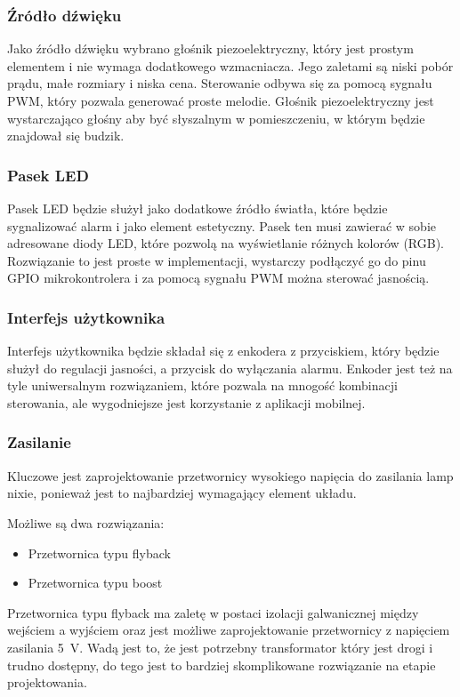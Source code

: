 \documentclass[../main.tex]{subfiles}
\begin{document}
\subsubsection{Źródło dźwięku}
Jako źródło dźwięku wybrano głośnik piezoelektryczny, który jest prostym elementem i nie wymaga dodatkowego wzmacniacza. Jego zaletami są niski pobór prądu, małe rozmiary i niska cena.
Sterowanie odbywa się za pomocą sygnału PWM, który pozwala generować proste melodie. Głośnik piezoelektryczny jest wystarczająco głośny
aby być słyszalnym w pomieszczeniu, w którym będzie znajdował się budzik.

\subsubsection{Pasek LED}
Pasek LED będzie służył jako dodatkowe źródło światła, które będzie sygnalizować alarm i jako element estetyczny. Pasek ten musi 
zawierać w sobie adresowane diody LED, które pozwolą na wyświetlanie różnych kolorów (RGB).
Rozwiązanie to jest proste w implementacji, wystarczy podłączyć go do pinu GPIO mikrokontrolera i za pomocą sygnału PWM można sterować jasnością.

\subsubsection{Interfejs użytkownika}
Interfejs użytkownika będzie składał się z enkodera z przyciskiem, który będzie służył do regulacji jasności, a przycisk do wyłączania alarmu.
Enkoder jest też na tyle uniwersalnym rozwiązaniem, które pozwala na mnogość kombinacji sterowania, ale wygodniejsze jest korzystanie z aplikacji mobilnej.

\subsubsection{Zasilanie}
Kluczowe jest zaprojektowanie przetwornicy wysokiego napięcia do zasilania lamp nixie, ponieważ jest to najbardziej wymagający element układu.

Możliwe są dwa rozwiązania:
\begin{itemize}
    \item Przetwornica typu flyback
    \item Przetwornica typu boost
\end{itemize}

Przetwornica typu flyback ma zaletę w postaci izolacji galwanicznej między wejściem a wyjściem oraz jest możliwe zaprojektowanie przetwornicy z napięciem zasilania \SI{5}{\volt}. 
Wadą jest to, że jest potrzebny transformator który jest drogi i trudno dostępny, do tego jest to bardziej skomplikowane rozwiązanie na etapie projektowania.
\end{document}
